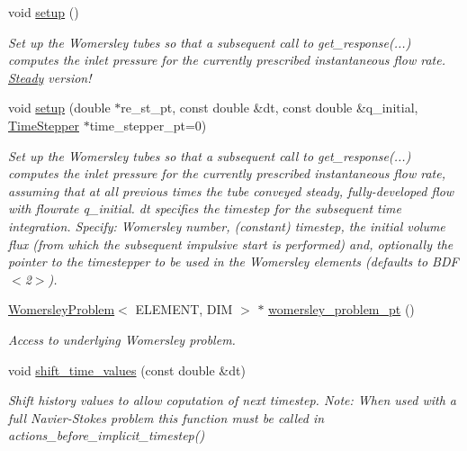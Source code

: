 \begin{DoxyCompactItemize}
void \hyperlink{classoomph_1_1WomersleyImpedanceTubeBase_a8524aff02e221d6fd8d9cfe58c2ef596}{setup} ()
\begin{DoxyCompactList}\small\item\em Set up the Womersley tubes so that a subsequent call to get\+\_\+response(...) computes the inlet pressure for the currently prescribed instantaneous flow rate. \hyperlink{classoomph_1_1Steady}{Steady} version! \end{DoxyCompactList}\item 
void \hyperlink{classoomph_1_1WomersleyImpedanceTubeBase_a912ef51e8ac9c44e80566126da7d591f}{setup} (double $\ast$re\+\_\+st\+\_\+pt, const double \&dt, const double \&q\+\_\+initial, \hyperlink{classoomph_1_1TimeStepper}{Time\+Stepper} $\ast$time\+\_\+stepper\+\_\+pt=0)
\begin{DoxyCompactList}\small\item\em Set up the Womersley tubes so that a subsequent call to get\+\_\+response(...) computes the inlet pressure for the currently prescribed instantaneous flow rate, assuming that at all previous times the tube conveyed steady, fully-\/developed flow with flowrate q\+\_\+initial. dt specifies the timestep for the subsequent time integration. Specify\+: Womersley number, (constant) timestep, the initial volume flux (from which the subsequent impulsive start is performed) and, optionally the pointer to the timestepper to be used in the Womersley elements (defaults to B\+D\+F$<$2$>$). \end{DoxyCompactList}\item 
\hyperlink{classoomph_1_1WomersleyProblem}{Womersley\+Problem}$<$ E\+L\+E\+M\+E\+NT, D\+IM $>$ $\ast$ \hyperlink{classoomph_1_1WomersleyImpedanceTubeBase_a59aa99fe9771f53ee482218da67d87c7}{womersley\+\_\+problem\+\_\+pt} ()
\begin{DoxyCompactList}\small\item\em Access to underlying Womersley problem. \end{DoxyCompactList}\item 
void \hyperlink{classoomph_1_1WomersleyImpedanceTubeBase_ad5796e64a6f25944dc9be6489149f513}{shift\+\_\+time\+\_\+values} (const double \&dt)
\begin{DoxyCompactList}\small\item\em Shift history values to allow coputation of next timestep. Note\+: When used with a full Navier-\/\+Stokes problem this function must be called in actions\+\_\+before\+\_\+implicit\+\_\+timestep() \end{DoxyCompactList}\item 

\end{DoxyCompactItemize}
